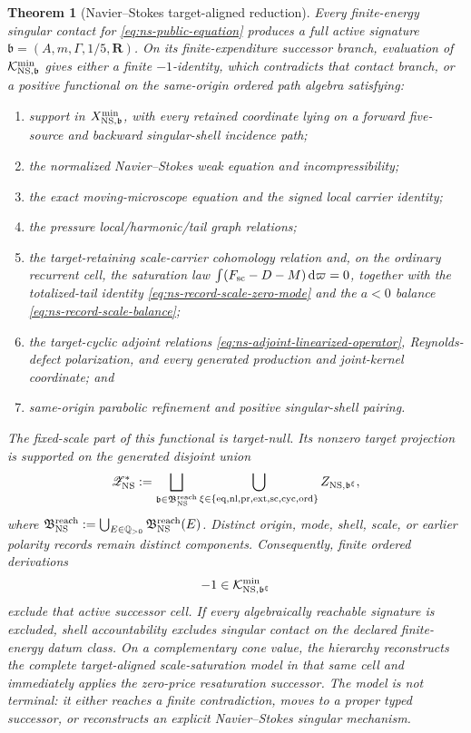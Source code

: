 \documentclass[11pt]{article}
\numberwithin{section}{part}
\theoremstyle{plain}
\newtheorem{theorem}{Theorem}[section]
\theoremstyle{definition}
\theoremstyle{remark}
\newcommand{\dd}{\,\mathrm d}
\begin{document}
\begin{theorem}[Navier--Stokes target-aligned reduction]
\label{thm:ns-target-aligned-reduction}
Every finite-energy singular contact for \eqref{eq:ns-public-equation}
produces a full active signature
\(\mathfrak b=(A,m,\Gamma,1/5,\mathbf R)\).  On its finite-expenditure
successor branch, evaluation of
\(\mathcal K^{\min}_{{\rm NS},\mathfrak b}\) gives either a
finite \(-1\)-identity, which contradicts that contact branch, or a positive
functional on the same-origin ordered path algebra satisfying:
\begin{enumerate}[label=\textup{(\roman*)}]
\item support in \(X^{\min}_{{\rm NS},\mathfrak b}\), with every retained
coordinate lying on a forward five-source and backward singular-shell
incidence path;
\item the normalized Navier--Stokes weak equation and incompressibility;
\item the exact moving-microscope equation and the signed local carrier
identity;
\item the pressure local/harmonic/tail graph relations;
\item the target-retaining scale-carrier cohomology relation and, on the
ordinary recurrent cell, the saturation law
\(\int(F_{\rm sc}-D-M)\dd\varpi=0\), together with the totalized-tail
identity \eqref{eq:ns-record-scale-zero-mode} and the \(a<0\) balance
\eqref{eq:ns-record-scale-balance};
\item the target-cyclic adjoint relations
\eqref{eq:ns-adjoint-linearized-operator}, Reynolds-defect polarization,
and every generated production and joint-kernel coordinate; and
\item same-origin parabolic refinement and positive singular-shell pairing.
\end{enumerate}
The fixed-scale part of this functional is target-null.  Its nonzero target
projection is supported on the generated disjoint union
\begin{equation}
 \label{eq:ns-exact-retained-union}
 \mathscr Z_{\rm NS}^{*}
 :=\bigsqcup_{\mathfrak b\in\mathfrak B_{\rm NS}^{\rm reach}}
 \bigcup_{\xi\in\{\mathrm{eq,nl,pr,ext,sc,cyc,ord}\}}
 Z_{{\rm NS},\mathfrak b^\xi},
\end{equation}
where
\(\mathfrak B_{\rm NS}^{\rm reach}
:=\bigcup_{E\in\mathbb Q_{>0}}\mathfrak B_{\rm NS}^{\rm reach}(E)\).
Distinct origin, mode, shell, scale, or
earlier polarity records remain distinct components.
Consequently, finite ordered derivations
\[
 -1\in\mathcal K^{\min}_{{\rm NS},\mathfrak b^\xi}
\]
exclude that active successor cell.  If every algebraically reachable signature is
excluded, shell accountability excludes singular contact on the declared
finite-energy datum class.  On a complementary cone value, the hierarchy
reconstructs the complete target-aligned scale-saturation model in that same
cell and immediately applies the zero-price resaturation successor.  The
model is not terminal: it either
reaches a finite contradiction, moves to a proper typed successor, or
reconstructs an explicit Navier--Stokes singular mechanism.
\end{theorem}
\end{document}
